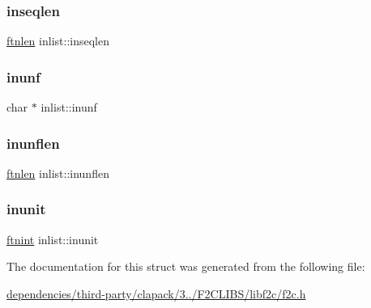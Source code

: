 \mbox{\label{structinlist_a552769caaf819b20716b02e9c713880d}} 
\subsubsection{\texorpdfstring{inseqlen}{inseqlen}}
{\footnotesize\ttfamily \hyperlink{dependencies_2third-party_2clapack_23_82_81_2_f2_c_l_i_b_s_2libf2c_2f2c_8h_a2ad57b5f7f73e0131623aa6dbff6d3f3}{ftnlen} inlist\+::inseqlen}

\mbox{\label{structinlist_a5cb5e045deaa5422f8c3107401fca1ba}} 
\subsubsection{\texorpdfstring{inunf}{inunf}}
{\footnotesize\ttfamily char $\ast$ inlist\+::inunf}

\mbox{\label{structinlist_a4a5e555086d129a2b8edc7d2ff3b3725}} 
\subsubsection{\texorpdfstring{inunflen}{inunflen}}
{\footnotesize\ttfamily \hyperlink{dependencies_2third-party_2clapack_23_82_81_2_f2_c_l_i_b_s_2libf2c_2f2c_8h_a2ad57b5f7f73e0131623aa6dbff6d3f3}{ftnlen} inlist\+::inunflen}

\mbox{\label{structinlist_a69244da0365f1012d4ed89d569c7e687}} 
\subsubsection{\texorpdfstring{inunit}{inunit}}
{\footnotesize\ttfamily \hyperlink{dependencies_2third-party_2clapack_23_82_81_2_f2_c_l_i_b_s_2libf2c_2f2c_8h_a9d70cdb573fb2bf020e1f6dba85fb1cc}{ftnint} inlist\+::inunit}



The documentation for this struct was generated from the following file\+:\begin{DoxyCompactItemize}
\item 
\hyperlink{dependencies_2third-party_2clapack_23_82_81_2_f2_c_l_i_b_s_2libf2c_2f2c_8h}{dependencies/third-\/party/clapack/3../\+F2\+C\+L\+I\+B\+S/libf2c/f2c.\+h}\end{DoxyCompactItemize}
